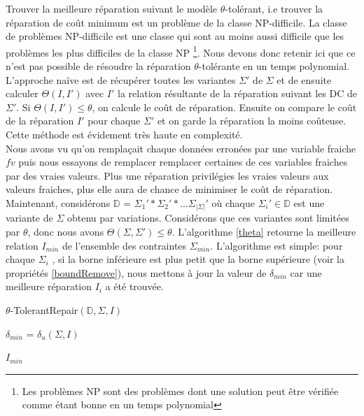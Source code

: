\documentclass[letterpaper, 12pt]{report}
\theoremstyle{definition}
\begin{document}
Trouver la meilleure réparation suivant le modèle $\theta$-tolérant, i.e trouver la réparation de coût minimum est un problème de la classe NP-difficile. La classe de problèmes NP-difficile est une classe qui sont au moins aussi difficile que les problèmes les plus difficiles de la classe NP \footnote{Les problèmes NP sont des problèmes dont une solution peut être vérifiée comme étant bonne en un temps polynomial}. Nous devons donc retenir ici que ce n'est pas possible de résoudre la réparation $\theta$-tolérante en un temps polynomial. L'approche naïve est de récupérer toutes les variantes $\Sigma'$ de $\Sigma$ et de ensuite calculer $\Theta(I,I')$  avec $I'$ la relation résultante de la réparation suivant les DC de $\Sigma'$. Si $\Theta(I,I') \leq \theta$, on calcule le coût de réparation. Ensuite on compare le coût de la réparation $I'$ pour chaque $\Sigma'$ et on garde la réparation la moins coûteuse. Cette méthode est évidement très haute en complexité.\\

Nous avons vu qu'on remplaçait chaque données erronées par une variable fraiche $fv$ puis nous essayons de remplacer remplacer certaines de ces variables fraiches par des vraies valeurs. Plus une réparation privilégies les vraies valeurs aux valeurs fraiches, plus elle aura de chance de minimiser le coût de réparation.\\

Maintenant, considérons $\mathbb{D}$ = $\Sigma_1 ' * \Sigma_2' * ... \Sigma_{|\Sigma|}'$ où chaque $\Sigma_i' \in \mathbb{D}$ est une variante de $\Sigma$ obtenu par variations. Considérons que ces variantes sont limitées par $\theta$, donc nous avons $\Theta(\Sigma,\Sigma') \leq \theta$. L'algorithme \ref{theta} retourne la meilleure relation $I_{min}$ de l'ensemble des contraintes $\Sigma_{min}$. L'algorithme est simple: pour chaque $\Sigma_i$ , si la borne inférieure est plus petit que la borne supérieure (voir la propriétés \ref{boundRemove}), nous mettons à jour la valeur de $\delta_{min}$ car une meilleure réparation $I_i$ a été trouvée. \\

\IncMargin{1em}
\begin{algorithm}
\label{theta}

	\DontPrintSemicolon
  \caption{$\theta$-TolerantRepair$(\mathbb{D},\Sigma,I)$}
  \LinesNumbered

    $\delta_{min}$ = $\delta_u(\Sigma,I)$\;

	\Return $I_{min}$

\end{algorithm}\DecMargin{1em}
\end{document}
